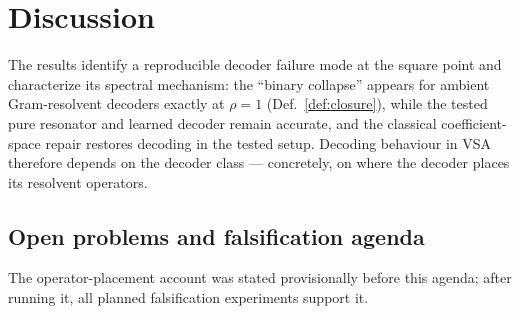 \documentclass[11pt,a4paper]{article}
\begin{document}
\section{Discussion}
\label{sec:discussion}

The results identify a reproducible decoder failure mode at the square point and characterize its spectral mechanism: the ``binary collapse'' appears for ambient Gram-resolvent decoders exactly at $\rho=1$ (Def.~\ref{def:closure}), while the tested pure resonator and learned decoder remain accurate, and the classical coefficient-space repair restores decoding in the tested setup. Decoding behaviour in VSA therefore depends on the decoder class --- concretely, on where the decoder places its resolvent operators.

\subsection{Open problems and falsification agenda}

The operator-placement account was stated provisionally before this agenda; after running it, all planned falsification experiments support it.
\end{document}
